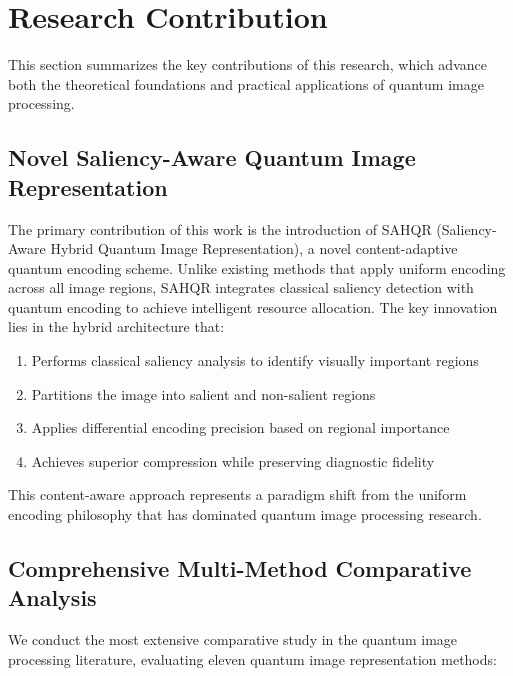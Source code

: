 \documentclass{ipol}
\begin{document}

\section{Research Contribution}\label{sec:contribution}

This section summarizes the key contributions of this research, which advance both the theoretical foundations and practical applications of quantum image processing.

\subsection{Novel Saliency-Aware Quantum Image Representation}

The primary contribution of this work is the introduction of SAHQR (Saliency-Aware Hybrid Quantum Image Representation), a novel content-adaptive quantum encoding scheme. Unlike existing methods that apply uniform encoding across all image regions, SAHQR integrates classical saliency detection with quantum encoding to achieve intelligent resource allocation. The key innovation lies in the hybrid architecture that:

\begin{enumerate}
\item Performs classical saliency analysis to identify visually important regions
\item Partitions the image into salient and non-salient regions
\item Applies differential encoding precision based on regional importance
\item Achieves superior compression while preserving diagnostic fidelity
\end{enumerate}

This content-aware approach represents a paradigm shift from the uniform encoding philosophy that has dominated quantum image processing research.

\subsection{Comprehensive Multi-Method Comparative Analysis}

We conduct the most extensive comparative study in the quantum image processing literature, evaluating eleven quantum image representation methods:
\end{document}
